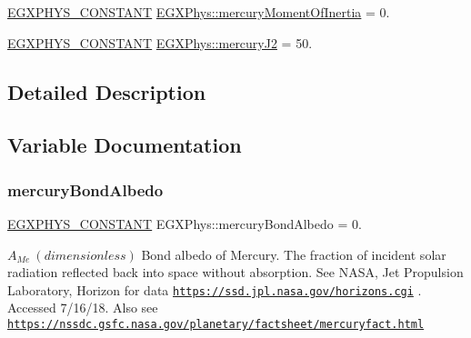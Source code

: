 \begin{DoxyCompactItemize}
\item 
\mbox{\hyperlink{group___e_g_x_phys-_constants-_macros_ga76980d288494ce1714c9ac68a95ba702}{E\+G\+X\+P\+H\+Y\+S\+\_\+\+C\+O\+N\+S\+T\+A\+NT}} \mbox{\hyperlink{group___e_g_x_phys-_constants-_astrophysics-_solar_system-_mercury-_bulk_ga54c31fac4e496e9e237656a5a24d6092}{E\+G\+X\+Phys\+::mercury\+Moment\+Of\+Inertia}} = 0.
\item 
\mbox{\hyperlink{group___e_g_x_phys-_constants-_macros_ga76980d288494ce1714c9ac68a95ba702}{E\+G\+X\+P\+H\+Y\+S\+\_\+\+C\+O\+N\+S\+T\+A\+NT}} \mbox{\hyperlink{group___e_g_x_phys-_constants-_astrophysics-_solar_system-_mercury-_bulk_ga0515d737bc0fda48122b7c195347e0bb}{E\+G\+X\+Phys\+::mercury\+J2}} = 50.
\end{DoxyCompactItemize}


\subsection{Detailed Description}


\subsection{Variable Documentation}
\mbox{\label{group___e_g_x_phys-_constants-_astrophysics-_solar_system-_mercury-_bulk_ga2bc9c9b9a62a05dda96ee4fa281aad24}} 
\subsubsection{\texorpdfstring{mercury\+Bond\+Albedo}{mercuryBondAlbedo}}
{\footnotesize\ttfamily \mbox{\hyperlink{group___e_g_x_phys-_constants-_macros_ga76980d288494ce1714c9ac68a95ba702}{E\+G\+X\+P\+H\+Y\+S\+\_\+\+C\+O\+N\+S\+T\+A\+NT}} E\+G\+X\+Phys\+::mercury\+Bond\+Albedo = 0.}

$ A_{Me} \ (dimensionless)$ Bond albedo of Mercury. The fraction of incident solar radiation reflected back into space without absorption. See N\+A\+SA, Jet Propulsion Laboratory, Horizon for data \href{https://ssd.jpl.nasa.gov/horizons.cgi}{\tt https\+://ssd.\+jpl.\+nasa.\+gov/horizons.\+cgi} . Accessed 7/16/18. Also see \href{https://nssdc.gsfc.nasa.gov/planetary/factsheet/mercuryfact.html}{\tt https\+://nssdc.\+gsfc.\+nasa.\+gov/planetary/factsheet/mercuryfact.\+html} \mbox{\label{group___e_g_x_phys-_constants-_astrophysics-_solar_system-_mercury-_bulk_gaa8b80e89b6cce05310b9651b527c465b}} 
